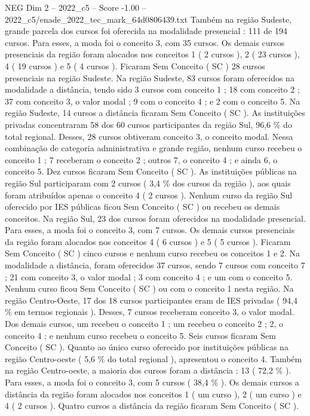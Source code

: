\begin{textsample}{NEG Dim 2 – 2022\_c5 – Score -1.00 – 2022\_c5/enade\_2022\_tec\_mark\_64d0806439.txt}
Também na região Sudeste, grande parcela dos cursos foi oferecida na modalidade presencial : 111 de 194 cursos.
Para esses, a moda foi o conceito 3, com 35 cursos.
Os demais cursos presenciais da região foram alocados nos conceitos 1 ( 2 cursos ), 2 ( 23 cursos ), 4 ( 19 cursos ) e 5 ( 4 cursos ).
Ficaram Sem Conceito ( SC ) 28 cursos presenciais na região Sudeste.
Na região Sudeste, 83 cursos foram oferecidos na modalidade a distância, tendo sido 3 cursos com conceito 1 ; 18 com conceito 2 ; 37 com conceito 3, o valor modal ; 9 com o conceito 4 ; e 2 com o conceito 5.
Na região Sudeste, 14 cursos a distância ficaram Sem Conceito ( SC ).
As instituições privadas concentraram 58 dos 60 cursos participantes da região Sul, 96,6 \% do total regional.
Desses, 28 cursos obtiveram conceito 3, o conceito modal.
Nessa combinação de categoria administrativa e grande região, nenhum curso recebeu o conceito 1 ; 7 receberam o conceito 2 ; outros 7, o conceito 4 ; e ainda 6, o conceito 5.
Dez cursos ficaram Sem Conceito ( SC ).
As instituições públicas na região Sul participaram com 2 cursos ( 3,4 \% dos cursos da região ), aos quais foram atribuídos apenas o conceito 4 ( 2 cursos ).
Nenhum curso da região Sul oferecido por IES públicas ficou Sem Conceito ( SC ) ou recebeu os demais conceitos.
Na região Sul, 23 dos cursos foram oferecidos na modalidade presencial.
Para esses, a moda foi o conceito 3, com 7 cursos.
Os demais cursos presenciais da região foram alocados nos conceitos 4 ( 6 cursos ) e 5 ( 5 cursos ).
Ficaram Sem Conceito ( SC ) cinco cursos e nenhum curso recebeu os conceitos 1 e 2.
Na modalidade a distância, foram oferecidos 37 cursos, sendo 7 cursos com conceito 7 ; 21 com conceito 3, o valor modal ; 3 com conceito 4 ; e um com o conceito 5.
Nenhum curso ficou Sem Conceito ( SC ) ou com o conceito 1 nesta região.
Na região Centro-Oeste, 17 dos 18 cursos participantes eram de IES privadas ( 94,4 \% em termos regionais ).
Desses, 7 cursos receberam conceito 3, o valor modal.
Dos demais cursos, um recebeu o conceito 1 ; um recebeu o conceito 2 ; 2, o conceito 4 ; e nenhum curso recebeu o conceito 5.
Seis cursos ficaram Sem Conceito ( SC ).
Quanto ao único curso oferecido por instituições públicas na região Centro-oeste ( 5,6 \% do total regional ), apresentou o conceito 4.
Também na região Centro-oeste, a maioria dos cursos foram a distância : 13 ( 72,2 \% ).
Para esses, a moda foi o conceito 3, com 5 cursos ( 38,4 \% ).
Os demais cursos a distância da região foram alocados nos conceitos 1 ( um curso ), 2 ( um curso ) e 4 ( 2 cursos ).
Quatro cursos a distância da região ficaram Sem Conceito ( SC ).

\end{textsample}
